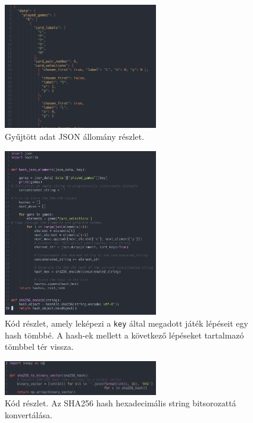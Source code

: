 \begin{figure}[h]
    \center
    \includegraphics[width=0.60\textwidth]{img/JSON.png}
    \caption{Gyűjtött adat JSON állomány részlet.}
    \label{code:json_allomany}
\end{figure}
\begin{figure}[h]
    \center
    \includegraphics[width=0.60\textwidth]{img/JSON_TO_SHA256.png}
    \caption{Kód részlet, amely leképezi a \lstinline{key} által megadott játék lépéseit egy hash tömbbé. A hash-ek mellett a következő lépéseket tartalmazó tömbbel tér vissza.}
    \label{code:json_to_hash}
\end{figure}

\begin{figure}[h]
    \center
    \includegraphics[width=0.60\textwidth]{img/hash_to_bit.png}
    \caption{Kód részlet. Az SHA256 hash hexadecimális string bitsorozattá konvertálása.}
    \label{code:hash_to_bit}
\end{figure}

